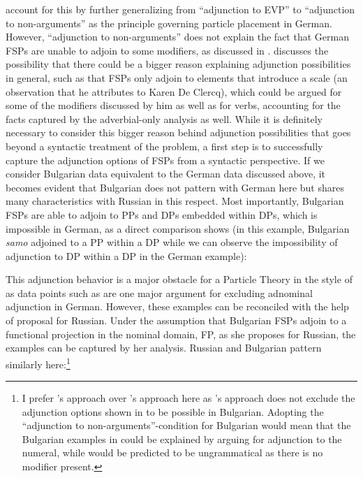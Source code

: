 \documentclass[output=paper,colorlinks,citecolor=brown]{langscibook}
\begin{document}
\noindent \citet{BuringHartmann2001} account for this by further generalizing from ``adjunction to EVP'' to ``adjunction to non-arguments'' as the principle governing particle placement in German. However, ``adjunction to non-arguments'' does not explain the fact that German FSPs are unable to adjoin to some modifiers, as discussed in . \citet[247]{Mursell2021} discusses the possibility that there could be a bigger reason explaining adjunction possibilities in general, such as that FSPs only adjoin to elements that introduce a scale (an observation that he attributes to Karen De Clercq), which could be argued for some of the modifiers discussed by him as well as for verbs, accounting for the facts captured by the adverbial-only analysis as well. While it is definitely necessary to consider this bigger reason behind adjunction possibilities that goes beyond a syntactic treatment of the problem, a first step is to successfully capture the adjunction options of FSPs from a syntactic perspective. If we consider Bulgarian data equivalent to the German data discussed above, it becomes evident that Bulgarian does not pattern with German here but shares many characteristics with Russian in this respect. Most importantly, Bulgarian FSPs are able to adjoin to PPs and DPs embedded within DPs, which is impossible in German, as a direct comparison shows (in this example, Bulgarian \textit{samo} adjoined to a PP within a DP while we can observe the impossibility of adjunction to DP within a DP in the German example):  

\ea\label{DPdata:2}
\z
\z  

\noindent This adjunction behavior is a major obstacle for a Particle Theory in the style of \citet{BuringHartmann2001} as data points such as  are one major argument for excluding adnominal adjunction in German. However, these examples can be reconciled with the help of  proposal for Russian. Under the assumption that Bulgarian FSPs adjoin to a functional projection in the nominal domain, FP, as she proposes for Russian, the examples can be captured by her analysis. Russian and Bulgarian pattern similarly here:\footnote{I prefer \citeauthor{Zanon2018}'s approach over \citeauthor{BuringHartmann2001}'s approach here as \citeauthor{Zanon2018}'s approach does not exclude the adjunction options shown in  to be possible in Bulgarian. Adopting the ``adjunction to non-arguments''-condition for Bulgarian would mean that the Bulgarian examples in  could be explained by arguing for adjunction to the numeral, while  would be predicted to be ungrammatical as there is no modifier present.} 
\end{document}
